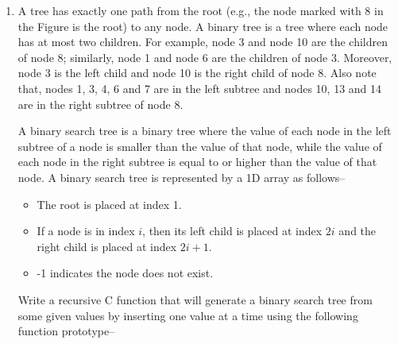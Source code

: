 \documentclass[12pt,a3paper]{article}
\begin{document}
\begin{enumerate}

  \item  A tree has exactly one path from the root (e.g., the node marked with 8 in the Figure is the root) to any node. A binary tree is a tree where each node has at most two children. For example, node 3 and node 10 are the children of node 8; similarly, node 1 and node 6 are the children of node 3. Moreover, node 3 is the left child and node 10 is the right child of node 8. Also note that, nodes 1, 3, 4, 6 and 7 are in the left subtree and nodes 10, 13 and 14 are in the right subtree of node 8.
\begin{center}
\end{center}
\noindent
A binary search tree is a binary tree where the value of each node in the left subtree of a node is smaller than the value of that node, while the value of each node in the right subtree is equal to or higher than the value of that node. A binary search tree is represented by a 1D array as follows--

\begin{itemize}
    \item[(i)] The root is placed at index 1.
    \item[(ii)] If a node is in index $i$, then its left child is placed at index $2i$ and the right child is placed at index $2i + 1$.
    \item[(iii)] -1 indicates the node does not exist.
\end{itemize}

\noindent
Write a recursive C function that will generate a binary search tree from some given values by inserting one value at a time using the following function prototype--


\end{enumerate}
\end{document}

